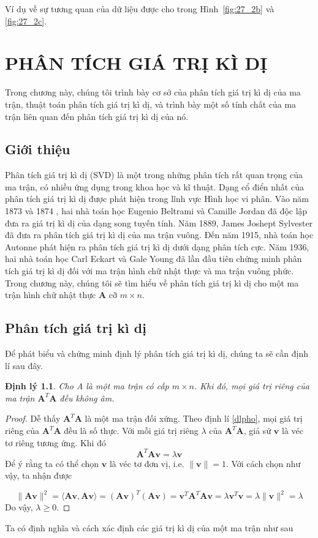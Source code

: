\documentclass[12pt,a4paper,oneside]{report}
\newtheorem{dl}{Định lý}[section]
\numberwithin{equation}{section}
\begin{document}
Ví dụ về sự tương quan của dữ liệu được cho trong Hình~\ref{fig:27_2b} và
\ref{fig:27_2c}.%
\chapter{ PHÂN TÍCH GIÁ TRỊ KÌ DỊ }

Trong chương này, chúng tôi trình bày cơ sở của phân tích giá trị kì dị của ma trận, thuật toán phân tích giá trị kì dị, và trình bày một số tính chất của ma trận liên quan đến phân tích giá trị kì dị của nó. 
\section{Giới thiệu}
Phân tích giá trị kì dị (SVD) là một trong những phân tích rất quan trọng của ma trận, có nhiều ứng dụng trong khoa học và kĩ thuật. Dạng cổ điển nhất của phân tích giá trị kì dị được phát hiện trong lĩnh vực Hình học vi phân. Vào năm 1873 và 1874 , hai nhà toán học Eugenio Beltrami và Camille Jordan đã độc lập đưa ra giá trị kì dị của dạng song tuyến tính\cite{stewart1993}. Năm 1889, James Joshept Sylvester đã đưa ra phân tích giá trị kì dị của ma trận vuông. Đến năm 1915, nhà toán học Autonne phát hiện ra phân tích giá trị kì dị dưới dạng phân tích cực. Năm 1936, hai nhà toán học Carl Eckart và Gale Young đã lần đầu tiên chứng minh phân tích giá trị kì dị đối với ma trận hình chữ nhật thực và ma trận vuông phức\cite{eckart1936}. Trong chương này, chúng tôi sẽ tìm hiểu về phân tích giá trị kì dị cho một ma trận hình chữ nhật thực $\mathbf{A}$ cỡ $m \times n$.
\section{Phân tích giá trị kì dị}
Để phát biểu và chứng minh định lý phân tích giá trị kì dị, chúng ta sẽ cần định lí sau đây.

\begin{dl} \cite{lay1994} \label{dl_1} Cho A là một ma trận có cấp $m \times n$. Khi đó, mọi giá trị riêng của ma trận $\mathbf{A}^{T} \mathbf{A}$ đều không âm.
\end{dl}
\begin{proof}
Dễ thấy $\mathbf{A}^{T} \mathbf{A}$ là một ma trận đối xứng. Theo định lí \ref{dlpho}, mọi giá trị riêng của $\mathbf{A}^{T} \mathbf{A}$ đều là số thực. Với mỗi giá trị riêng $\lambda$ của $\mathbf{A}^{T} \mathbf{A}$, giả sử $\mathbf{v}$ là véc tơ riêng tương ứng. Khi đó
\begin{equation} \label{eq1}
\mathbf{A}^{T} \mathbf{A} \mathbf{v}=\lambda \mathbf{v}
\end{equation}
Để ý rằng ta có thể chọn $\mathbf{v}$ là véc tơ đơn vị, i.e. $\|\mathbf{v}\|=1$. Với cách chọn như vậy, ta nhận được

\begin{equation} \label{eq2}
\|\mathbf{A} \mathbf{v}\|^{2}=\langle\mathbf{A} \mathbf{v}, \mathbf{A v}\rangle=(\mathbf{A v})^{T}(\mathbf{A v})=\mathbf{v}^{T} \mathbf{A}^{T} \mathbf{A} \mathbf{v}=\lambda \mathbf{v}^{T} \mathbf{v}=\lambda\|\mathbf{v}\|^{2}=\lambda
\end{equation}
Do vậy, $\lambda \geqslant 0$.
\end{proof}
Ta có định nghĩa và cách xác định các giá trị kì dị của một ma trận như sau
\end{document}
